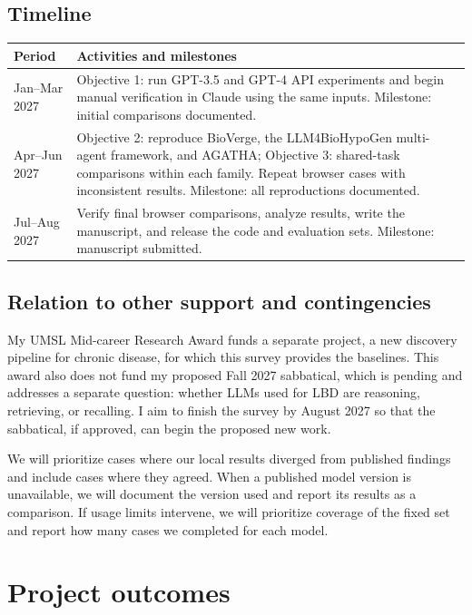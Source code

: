 \documentclass[11pt]{article}
\begin{document}
\subsection*{Timeline}

\begin{table}[h]
\centering\small
\begin{tabularx}{\textwidth}{@{}lX@{}}
\toprule
Period & Activities and milestones \\
\midrule
Jan--Mar 2027 & Objective 1: run GPT-3.5 and GPT-4 API experiments and begin manual verification in Claude using the same inputs. Milestone: initial comparisons documented. \\
Apr--Jun 2027 & Objective 2: reproduce BioVerge, the LLM4BioHypoGen multi-agent framework, and AGATHA; Objective 3: shared-task comparisons within each family. Repeat browser cases with inconsistent results. Milestone: all reproductions documented. \\
Jul--Aug 2027 & Verify final browser comparisons, analyze results, write the manuscript, and release the code and evaluation sets. Milestone: manuscript submitted. \\
\bottomrule
\end{tabularx}
\end{table}

\subsection*{Relation to other support and contingencies}

My UMSL Mid-career Research Award funds a separate project, a new discovery pipeline for chronic disease, for which this survey provides the baselines. This award also does not fund my proposed Fall 2027 sabbatical, which is pending and addresses a separate question: whether LLMs used for LBD are reasoning, retrieving, or recalling. I aim to finish the survey by August 2027 so that the sabbatical, if approved, can begin the proposed new work.

We will prioritize cases where our local results diverged from published findings and include cases where they agreed. When a published model version is unavailable, we will document the version used and report its results as a comparison. If usage limits intervene, we will prioritize coverage of the fixed set and report how many cases we completed for each model.

\section*{Project outcomes}
\end{document}
